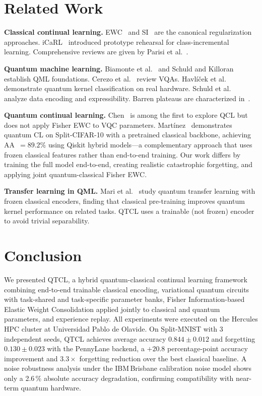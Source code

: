 \documentclass[a4paper,nopdfoutputerror]{quantumarticle}
\begin{document}
\section{Related Work}
\label{sec:related}

\textbf{Classical continual learning.}
EWC~\cite{kirkpatrick2017overcoming} and SI~\cite{zenke2017continual}
are the canonical regularization approaches.
iCaRL~\cite{Rebuffi2017} introduced prototype rehearsal for class-incremental
learning.
Comprehensive reviews are given by Parisi et al.~\cite{parisi2019continual}.

\textbf{Quantum machine learning.}
Biamonte et al.~\cite{biamonte2017} and Schuld and Killoran~\cite{schuld2019}
establish QML foundations.
Cerezo et al.~\cite{cerezo2021variational} review VQAs.
Havlíček et al.~\cite{havlicek2019} demonstrate quantum kernel classification
on real hardware.
Schuld et al.~\cite{schuld2021effect} analyze data encoding and expressibility.
Barren plateaus are characterized in~\cite{mcclean2018barren}.

\textbf{Quantum continual learning.}
Chen~\cite{chen2022quantumcl} is among the first to explore QCL but does not
apply Fisher EWC to VQC parameters.
Martínez~\cite{danimap27qcl} demonstrates quantum CL on Split-CIFAR-10 with
a pretrained classical backbone, achieving AA~$=89.2\%$ using Qiskit hybrid
models---a complementary approach that uses frozen classical features rather
than end-to-end training.
Our work differs by training the full model end-to-end, creating realistic
catastrophic forgetting, and applying joint quantum-classical Fisher EWC.

\textbf{Transfer learning in QML.}
Mari et al.~\cite{mari2020transfer} study quantum transfer learning with
frozen classical encoders, finding that classical pre-training improves
quantum kernel performance on related tasks.
QTCL uses a trainable (not frozen) encoder to avoid trivial separability.


\section{Conclusion}
\label{sec:conclusion}

We presented QTCL, a hybrid quantum-classical continual learning framework
combining end-to-end trainable classical encoding, variational quantum circuits
with task-shared and task-specific parameter banks, Fisher Information-based
Elastic Weight Consolidation applied jointly to classical and quantum parameters,
and experience replay.
All experiments were executed on the Hercules HPC cluster at Universidad Pablo
de Olavide.
On Split-MNIST with 3 independent seeds, QTCL achieves average accuracy
$0.844 \pm 0.012$ and forgetting $0.130 \pm 0.023$ with the PennyLane backend,
a $+20.8$ percentage-point accuracy improvement and $3.3\times$ forgetting
reduction over the best classical baseline.
A noise robustness analysis under the IBM\,Brisbane calibration noise model
shows only a 2.6\,\% absolute accuracy degradation, confirming compatibility
with near-term quantum hardware.
\end{document}

